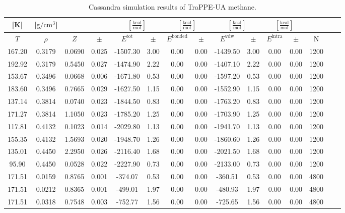 \documentclass[%
 aip,
 jcp,
 sd,%
 amsmath,amssymb,
]{revtex4-1}
\begin{document}
\begin{table*}[!htbp]
\centering
\caption{Cassandra simulation results of TraPPE-UA methane.}
\label{tab:sim-res-TraPPE-methane}
\begin{ruledtabular}
\begin{tabular}{ccccccccccccccc}
[K] & [$\mathrm{g/cm^3}$] &  &  & \multicolumn{2}{c}{$[\frac{\mathrm{kcal}}{\mathrm{mol}}]$} & \multicolumn{2}{c}{$[\frac{\mathrm{kcal}}{\mathrm{mol}}]$} & \multicolumn{2}{c}{$[\frac{\mathrm{kcal}}{\mathrm{mol}}]$} &\multicolumn{2}{c}{$[\frac{\mathrm{kcal}}{\mathrm{mol}}]$} & \\
\hline
$T$ & $\rho$ & $Z$ & $\pm$ & $E^{\mathrm{tot}}$ & $\pm$ & $E^{\mathrm{bonded}}$ & $\pm$ & $E^{\mathrm{vdw}}$ & $\pm$ & $E^{\mathrm{intra}}$ & $\pm$ & N\\
\hline
167.20	&	0.3179	&	0.0690	&	0.025	&	-1507.30	&	3.00	&	0.00	&	0.00	&	-1439.50	&	3.00	&	0.00	&	0.00	&	1200	\\
192.92	&	0.3179	&	0.5450	&	0.027	&	-1474.90	&	2.22	&	0.00	&	0.00	&	-1407.10	&	2.22	&	0.00	&	0.00	&	1200	\\
153.67	&	0.3496	&	0.0668	&	0.006	&	-1671.80	&	0.53	&	0.00	&	0.00	&	-1597.20	&	0.53	&	0.00	&	0.00	&	1200	\\
183.60	&	0.3496	&	0.7665	&	0.029	&	-1627.50	&	1.15	&	0.00	&	0.00	&	-1552.90	&	1.15	&	0.00	&	0.00	&	1200	\\
137.14	&	0.3814	&	0.0740	&	0.023	&	-1844.50	&	0.83	&	0.00	&	0.00	&	-1763.20	&	0.83	&	0.00	&	0.00	&	1200	\\
171.27	&	0.3814	&	1.1050	&	0.023	&	-1785.20	&	1.25	&	0.00	&	0.00	&	-1703.90	&	1.25	&	0.00	&	0.00	&	1200	\\
117.81	&	0.4132	&	0.1023	&	0.014	&	-2029.80	&	1.13	&	0.00	&	0.00	&	-1941.70	&	1.13	&	0.00	&	0.00	&	1200	\\
155.35	&	0.4132	&	1.5693	&	0.020	&	-1948.70	&	1.26	&	0.00	&	0.00	&	-1860.60	&	1.26	&	0.00	&	0.00	&	1200	\\
135.01	&	0.4450	&	2.2950	&	0.026	&	-2116.40	&	1.68	&	0.00	&	0.00	&	-2021.50	&	1.68	&	0.00	&	0.00	&	1200	\\
95.90	&	0.4450	&	0.0528	&	0.022	&	-2227.90	&	0.73	&	0.00	&	0.00	&	-2133.00	&	0.73	&	0.00	&	0.00	&	1200	\\
171.51	&	0.0159	&	0.8765	&	0.001	&	-374.07	&	0.53	&	0.00	&	0.00	&	-360.51	&	0.53	&	0.00	&	0.00	&	4800	\\
171.51	&	0.0212	&	0.8365	&	0.001	&	-499.01	&	1.97	&	0.00	&	0.00	&	-480.93	&	1.97	&	0.00	&	0.00	&	4800	\\
171.51	&	0.0318	&	0.7548	&	0.003	&	-752.77	&	1.56	&	0.00	&	0.00	&	-725.65	&	1.56	&	0.00	&	0.00	&	4800	\\

\end{tabular}
\end{ruledtabular}
\end{table*}
\end{document}
